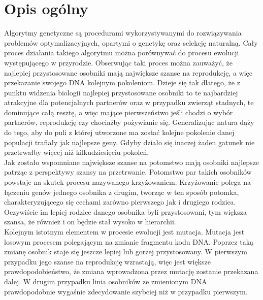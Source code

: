 \documentclass[twoside]{iisthesis}
\begin{document}
\section{Opis ogólny}
Algorytmy genetyczne są procedurami wykorzystywanymi do rozwiązywania problemów optymalizacyjnych, opartymi o genetykę oraz selekcję naturalną. Cały proces działania takiego algorytmu można porównywać do procesu ewolucji występującego w przyrodzie\cite{ga_book}. Obserwując taki proces można zauważyć, że najlepiej przystosowane osobniki mają największe szanse na reprodukcję, a więc przekazanie swojego DNA kolejnym pokoleniom. Dzieje się tak dlatego, że z punktu widzenia biologii najlepiej przystosowane osobniki to te najbardziej atrakcyjne dla potencjalnych partnerów oraz w przypadku zwierząt stadnych, te dominujące całą resztę, a więc mające pierwszeństwo jeśli chodzi o wybór partnerów, reprodukcję czy chociażby pożywianie się. Generalizując natura dąży do tego, aby do puli z której utworzone ma zostać kolejne pokolenie danej populacji trafiały jak najlepsze geny. Gdyby działo się inaczej żaden gatunek nie przetrwałby więcej niż kilkudziesięciu pokoleń.\\
Jak zostało wspomniane największe szanse na potomstwo mają osobniki najlepsze patrząc z perspektywy szansy na przetrwanie. Potomstwo par takich osobników powstaje na skutek procesu nazywanego krzyżowaniem. Krzyżowanie polega na łączeniu genów jednego osobnika z drugim, tworząc w ten sposób potomka, charakteryzującego się cechami zarówno pierwszego jak i drugiego rodzica. Oczywiście im lepiej rodzice danego osobnika byli przystosowani, tym większa szansa, że również i on będzie stał wysoko w hierarchii.\\
Kolejnym istotnym elementem w procesie ewolucji jest mutacja. Mutacja jest losowym procesem polegającym na zmianie fragmentu kodu DNA. Poprzez taką zmianę osobnik staje się jeszcze lepiej lub gorzej przystosowany. W pierwszym przypadku jego szanse na reprodukcję wzrastają, więc jest większe prawdopodobieństwo, że zmiana wprowadzona przez mutację zostanie przekazana dalej. W drugim przypadku linia osobników ze zmienionym DNA prawdopodobnie wygaśnie zdecydowanie szybciej niż w przypadku pierwszym.
\end{document}
